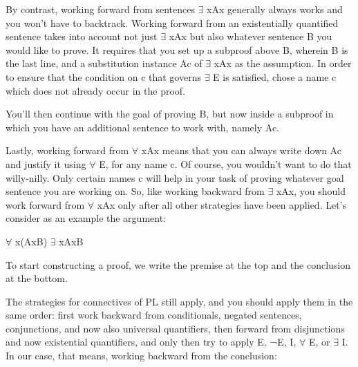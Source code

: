 By contrast, working forward from sentences $\exists$ xAx generally always works and you won’t have to backtrack. Working forward from an existentially quantified sentence takes into account not just $\exists$ xAx but also whatever sentence B you would like to prove. It requires that you set up a subproof above B, wherein B is the last line, and a substitution instance Ac of $\exists$ xAx as the assumption. In order to ensure that the condition on c that governs $\exists$ E is satisfied, chose a name c which does not already occur in the proof.
\begin{fitchproof}
\ellipsesline
{}				
\ellipsesline
{}		
\open
{}
\close
{}	
\end{fitchproof}
You’ll then continue with the goal of proving B, but now inside a subproof in which you have an additional sentence to work with, namely Ac.

Lastly, working forward from $\forall$ xAx means that you can always write down Ac and justify it using $\forall$ E, for any name c. Of course, you wouldn’t want to do that willy-nilly. Only certain names c will help in your task of proving whatever goal sentence you are working on. So, like working backward from $\exists$ xAx, you should work forward from $\forall$ xAx only after all other strategies have been applied. Let’s consider as an example the argument:
\begin{center}
$\forall$ x(Ax\eif B) \therefore $\exists$ xAx\eif B
\end{center}
To start constructing a proof, we write the premise at the top and the conclusion at the bottom.
\begin{fitchproof}
\ellipsesline
{}
\end{fitchproof}
The strategies for connectives of PL still apply, and you should apply them in the same order: first work backward from conditionals, negated sentences, conjunctions, and now also universal quantifiers, then forward from disjunctions and now existential quantifiers, and only then try to apply \eif E, ¬E, \eor I, $\forall$ E, or $\exists$ I. In our case, that means, working backward from the conclusion:
\begin{fitchproof}
\open
{}
\ellipsesline
{}
\close
{}
\end{fitchproof}

